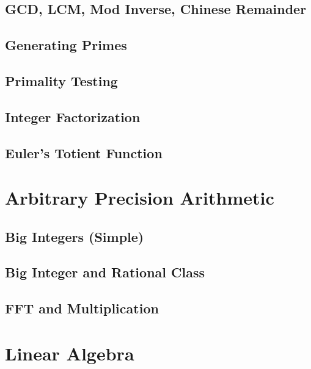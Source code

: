 \subsection{GCD, LCM, Mod Inverse, Chinese Remainder}

\subsection{Generating Primes}

\subsection{Primality Testing}

\subsection{Integer Factorization}

\subsection{Euler's Totient Function}


\section{Arbitrary Precision Arithmetic}
\setcounter{section}{4}
\setcounter{subsection}{0}
\subsection{Big Integers (Simple)}

\subsection{Big Integer and Rational Class}

\subsection{FFT and Multiplication}


\section{Linear Algebra}
\setcounter{section}{5}
\setcounter{subsection}{0}
